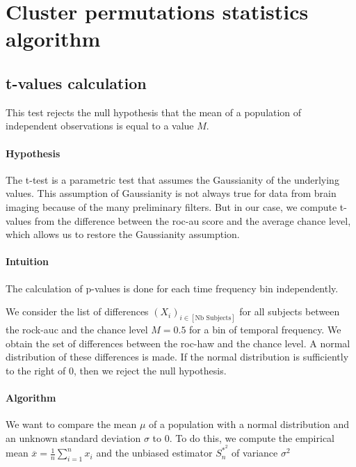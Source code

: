 \section{Cluster permutations statistics algorithm}

\subsection{t-values calculation}

This test rejects the null hypothesis that the mean of a population of independent observations is equal to a value $M$.

\paragraph{Hypothesis}

The t-test is a parametric test that assumes the Gaussianity of the underlying values. This assumption of Gaussianity is not always true for data from brain imaging because of the many preliminary filters. But in our case, we compute t-values from the difference between the roc-au score and the average chance level, which allows us to restore the Gaussianity assumption.

\paragraph{Intuition}

The calculation of p-values is done for each time frequency bin independently.

We consider the list of differences $(X_i)_{i \in [\text{Nb Subjects}]}$ for all subjects between the rock-auc and the chance level $M=0.5$ for a bin of temporal frequency. We obtain the set of differences between the roc-haw and the chance level. A normal distribution of these differences is made. If the normal distribution is sufficiently to the right of 0, then we reject the null hypothesis.

\paragraph{Algorithm}

We want to compare the mean $\mu$ of a population with a normal distribution and an unknown standard deviation $\sigma$ to $0$. To do this, we compute the empirical mean $\overline{x} = \frac{1}{n}\sum_{i=1}^{n}x_i$ and the unbiased estimator $S^{\ast ^2}_n$ of variance $\sigma^2$

